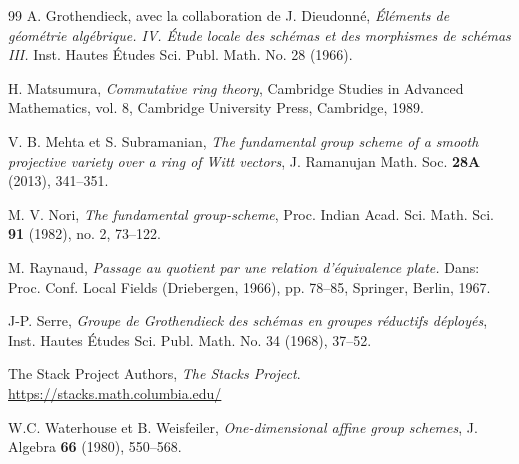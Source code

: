 \documentclass[11pt]{amsart}
\numberwithin{equation}{section}
\theoremstyle{definition}
\theoremstyle{remark}
\begin{document}
\begin{thebibliographyfr}{99}
 A. Grothendieck, avec la collaboration de J. Dieudonn\'e, \emph{\'El\'ements de  g\'eom\'etrie alg\'ebrique. IV. \'Etude locale des sch\'emas et des morphismes
de sch\'emas III.} Inst. Hautes \'Etudes Sci. Publ. Math. No. 28 (1966).

 H. Matsumura, \emph{Commutative ring theory}, Cambridge Studies in Advanced Mathematics, vol. 8,
Cambridge University Press, Cambridge, 1989.

 V. B. Mehta et S. Subramanian, \emph{The fundamental group scheme of a smooth projective variety over a ring of Witt
vectors}, J. Ramanujan Math. Soc. {\bf 28A} (2013), 341--351.

 M. V. Nori, \emph{The fundamental group-scheme}, Proc. Indian Acad. Sci. Math. Sci. {\bf 91} (1982), no. 2, 73--122.

 M. Raynaud, \emph{Passage au quotient par une relation d'\'equivalence plate.} Dans: Proc. Conf. Local Fields (Driebergen, 1966),
pp. 78--85, Springer, Berlin, 1967.

 J-P. Serre, \emph{Groupe de Grothendieck des sch\'emas en groupes r\'eductifs d\'eploy\'es}, Inst. Hautes \'Etudes Sci. Publ. Math. No. 34 (1968), 37--52.

 The Stack Project Authors, \emph{The Stacks Project}. \href{https://stacks.math.columbia.edu/}{https://stacks.math.columbia.edu/}

  W.C. Waterhouse et B. Weisfeiler, \emph{One-dimensional affine group schemes}, J. Algebra {\bf 66} (1980), 550--568.

\end{thebibliographyfr}
\end{document}
